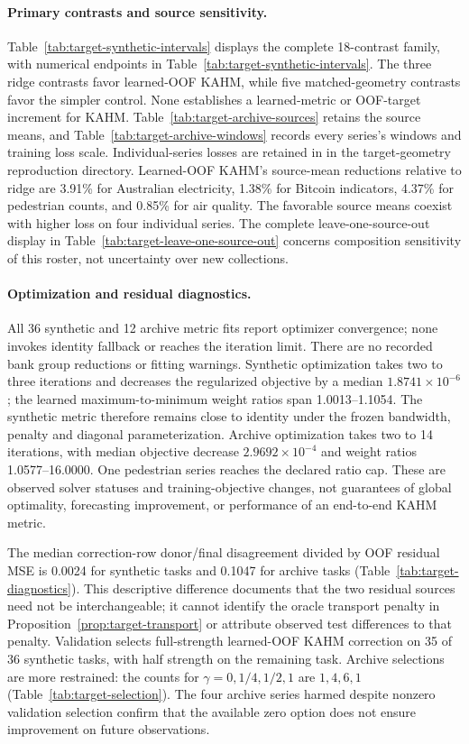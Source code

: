 \paragraph{Primary contrasts and source sensitivity.}
Table~\ref{tab:target-synthetic-intervals} displays the complete
18-contrast family, with numerical endpoints in
Table~\ref{tab:target-synthetic-intervals}. The three ridge contrasts
favor learned-OOF KAHM, while five matched-geometry contrasts favor
the simpler control. None establishes a learned-metric or OOF-target
increment for KAHM. Table~\ref{tab:target-archive-sources} retains
the source means, and Table~\ref{tab:target-archive-windows} records
every series's windows and training loss scale. Individual-series
losses are retained in  in the target-geometry reproduction directory. Learned-OOF KAHM's source-mean
reductions relative to ridge are 3.91\% for Australian electricity,
1.38\% for Bitcoin indicators, 4.37\% for pedestrian counts, and
0.85\% for air quality. The favorable source means coexist with higher loss on four
individual series. The complete leave-one-source-out
display in Table~\ref{tab:target-leave-one-source-out} concerns
composition sensitivity of this roster, not uncertainty over new
collections.

\paragraph{Optimization and residual diagnostics.}
All 36 synthetic and 12 archive metric fits report optimizer
convergence; none invokes identity fallback or reaches the iteration
limit. There are no recorded bank group reductions or fitting warnings.
Synthetic optimization takes two to three iterations and decreases
the regularized objective by a median $1.8741\times10^{-6}$; the
learned maximum-to-minimum weight ratios span 1.0013--1.1054. The
synthetic metric therefore remains close to identity under the frozen
bandwidth, penalty and diagonal parameterization. Archive optimization
takes two to 14 iterations, with median objective decrease
$2.9692\times10^{-4}$ and weight ratios 1.0577--16.0000. One pedestrian
series reaches the declared ratio cap. These are observed solver
statuses and training-objective changes, not guarantees of global
optimality, forecasting improvement, or performance of an
end-to-end KAHM metric.

The median correction-row donor/final disagreement divided by OOF
residual MSE is 0.0024 for synthetic tasks and 0.1047 for archive tasks
(Table~\ref{tab:target-diagnostics}). This descriptive difference
documents that the two residual sources need not be interchangeable;
it cannot identify the oracle transport penalty in
Proposition~\ref{prop:target-transport} or attribute observed test
differences to that penalty. Validation selects full-strength
learned-OOF KAHM correction on 35 of 36 synthetic tasks, with half
strength on the remaining task. Archive selections are more restrained:
the counts for $\gamma=0,1/4,1/2,1$ are $1,4,6,1$
(Table~\ref{tab:target-selection}). The four archive series harmed
despite nonzero validation selection confirm that the available zero
option does not ensure improvement on future observations.

